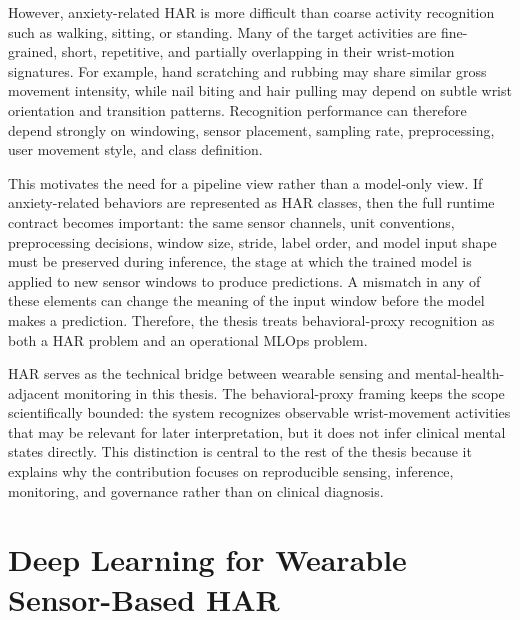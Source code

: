 However, anxiety-related HAR is more difficult than coarse activity recognition such as walking, sitting, or standing. Many of the target activities are fine-grained, short, repetitive, and partially overlapping in their wrist-motion signatures. For example, hand scratching and rubbing may share similar gross movement intensity, while nail biting and hair pulling may depend on subtle wrist orientation and transition patterns. Recognition performance can therefore depend strongly on windowing, sensor placement, sampling rate, preprocessing, user movement style, and class definition.

This motivates the need for a pipeline view rather than a model-only view. If anxiety-related behaviors are represented as HAR classes, then the full runtime contract becomes important: the same sensor channels, unit conventions, preprocessing decisions, window size, stride, label order, and model input shape must be preserved during inference, the stage at which the trained model is applied to new sensor windows to produce predictions. A mismatch in any of these elements can change the meaning of the input window before the model makes a prediction. Therefore, the thesis treats behavioral-proxy recognition as both a HAR problem and an operational MLOps problem.

HAR serves as the technical bridge between wearable sensing and mental-health-adjacent monitoring in this thesis. The behavioral-proxy framing keeps the scope scientifically bounded: the system recognizes observable wrist-movement activities that may be relevant for later interpretation, but it does not infer clinical mental states directly. This distinction is central to the rest of the thesis because it explains why the contribution focuses on reproducible sensing, inference, monitoring, and governance rather than on clinical diagnosis.


\section{Deep Learning for Wearable Sensor-Based HAR}

